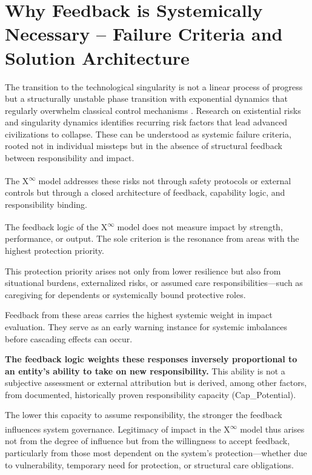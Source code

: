 \documentclass[12pt,a4paper]{article}
\begin{document}
\section{Why Feedback is Systemically Necessary – Failure Criteria and Solution Architecture}

The transition to the technological singularity is not a linear process of progress but a structurally unstable phase transition with exponential dynamics that regularly overwhelm classical control mechanisms \cite{bostrom2014,yudkowsky2008,russell2019,amodei2016}. Research on existential risks and singularity dynamics identifies recurring risk factors that lead advanced civilizations to collapse. These can be understood as systemic failure criteria, rooted not in individual missteps but in the absence of structural feedback between responsibility and impact.

The \texorpdfstring{X\textsuperscript{\(\infty\)}}{X-Infinity} model addresses these risks not through safety protocols or external controls but through a closed architecture of feedback, capability logic, and responsibility binding.

The feedback logic of the \texorpdfstring{X\textsuperscript{\(\infty\)}}{X-Infinity} model does not measure impact by strength, performance, or output.  
The sole criterion is the resonance from areas with the highest protection priority.

This protection priority arises not only from lower resilience but also from situational burdens, externalized risks, or assumed care responsibilities—such as caregiving for dependents or systemically bound protective roles.

Feedback from these areas carries the highest systemic weight in impact evaluation.  
They serve as an early warning instance for systemic imbalances before cascading effects can occur.

\textbf{The feedback logic weights these responses inversely proportional to an entity’s ability to take on new responsibility.}  
This ability is not a subjective assessment or external attribution but is derived, among other factors, from documented, historically proven responsibility capacity (Cap\_Potential).

The lower this capacity to assume responsibility, the stronger the feedback influences system governance.  
Legitimacy of impact in the \texorpdfstring{X\textsuperscript{\(\infty\)}}{X-Infinity} model thus arises not from the degree of influence but from the willingness to accept feedback, particularly from those most dependent on the system’s protection—whether due to vulnerability, temporary need for protection, or structural care obligations.
\end{document}
